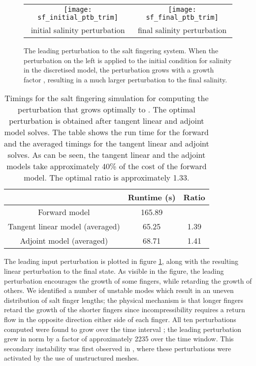\documentclass{siamltex}
\begin{document}
\begin{figure}
  \centering
  \begin{tabular}{cc}
    \texttt{[image: sf\_initial\_ptb\_trim]} & \texttt{[image: sf\_final\_ptb\_trim]}
    \\
    initial salinity perturbation & final salinity perturbation
  \end{tabular}
  \caption{The leading perturbation to the salt fingering system. When the perturbation on the left is applied to the initial
    condition for salinity in the discretised model, the perturbation grows with a growth factor , resulting in a much larger perturbation
  to the final salinity.}
  \label{fig:salt_fingering_ptb}
\end{figure}
\begin{table}[t]
\centering
\begin{tabular}{ccc}
\toprule
       & Runtime (s) & Ratio \\
\midrule
Forward model & 165.89 &     \\
Tangent linear model (averaged) & 65.25  & 1.39 \\
Adjoint model (averaged) & 68.71 & 1.41 \\
\bottomrule
\end{tabular}
\caption{Timings for the salt fingering simulation for computing the perturbation that grows optimally to . 
  The optimal perturbation is obtained after  tangent linear and adjoint model solves. 
 The table shows the run time for the forward and the averaged timings for the tangent linear and adjoint solves.
  As can be seen, the tangent linear and the adjoint models take approximately 40\% of the cost of the forward model. The
  optimal ratio is approximately 1.33.}
\label{tab:salt_fingering_timings}
\end{table}

The leading input perturbation is plotted in figure \ref{fig:salt_fingering_ptb}, along with the
resulting linear perturbation to the final state. As visible in the figure, the leading perturbation
encourages the growth of some fingers, while retarding the growth of others. We identified a number
of unstable modes which result in an uneven distribution of salt finger lengths; the physical
mechanism is that longer fingers retard the growth of the shorter fingers since incompressibility
requires a return flow in the opposite direction either side of each finger.  All ten perturbations
computed were found to grow over the time interval ; the leading perturbation grew in
norm by a factor of approximately 2235 over the time window. This secondary instability was first
observed in \cite{mactavish2013}, where these perturbations were activated by the use of unstructured
meshes.
\end{document}
